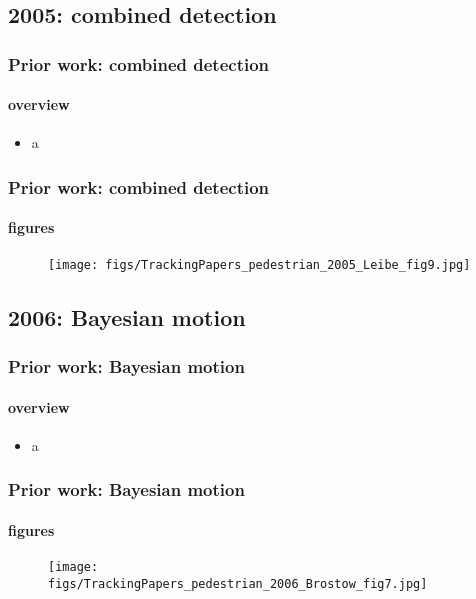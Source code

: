 \subsection{2005: combined detection}
\begin{frame}
\frametitle{Prior work: combined detection}
\framesubtitle{overview}
\mypagenum
	\begin{itemize}
		\item a
	\end{itemize}
\end{frame}


\begin{frame}
\frametitle{Prior work: combined detection}
\framesubtitle{figures}
\mypagenum
	\begin{figure}
		\texttt{[image: figs/TrackingPapers\_pedestrian\_2005\_Leibe\_fig9.jpg]}
	\end{figure}
\end{frame}



\subsection{2006: Bayesian motion}
\begin{frame}
\frametitle{Prior work: Bayesian motion}
\framesubtitle{overview}
\mypagenum
	\begin{itemize}
		\item a
	\end{itemize}
\end{frame}


\begin{frame}
\frametitle{Prior work: Bayesian motion}
\framesubtitle{figures}
\mypagenum
	\begin{figure}
		\texttt{[image: figs/TrackingPapers\_pedestrian\_2006\_Brostow\_fig7.jpg]}
	\end{figure}
\end{frame}


\printbibliography


